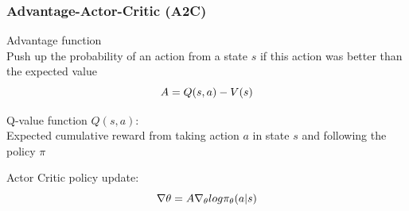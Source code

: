 \begin{frame}
    \frametitle{Advantage-Actor-Critic (A2C)}

\begin{PraesentationAufzaehlung}
	\item Advantage function\\
		Push up the probability of an action from a state $s$ if this action was better than the expected value
		\begin{equation}
		\mathnormal{
		A = Q(s, a) - V(s)
		}
		\end{equation}
	\item Q-value function $Q(s, a)$:\\ %
		Expected cumulative reward from taking action $a$ in state $s$ and following the policy $\pi$
	\item Actor Critic policy update:
	\begin{equation}
		\mathnormal{
		\nabla \theta = A \nabla_\theta log \pi_\theta (a | s)}
	\end{equation}
\end{PraesentationAufzaehlung}

\end{frame}
\clearpage










